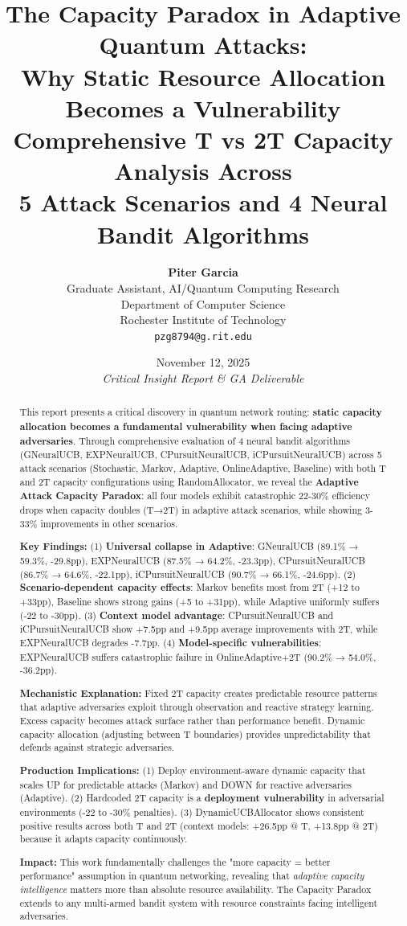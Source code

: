 \documentclass[11pt,a4paper]{article}
\title{
  \vspace{-1.5cm}
  \textbf{\LARGE The Capacity Paradox in Adaptive Quantum Attacks:} \\
  \vspace{0.4cm}
  \textbf{\Large Why Static Resource Allocation Becomes a Vulnerability} \\
  \vspace{0.6cm}
  \large Comprehensive T vs 2T Capacity Analysis Across \\
  5 Attack Scenarios and 4 Neural Bandit Algorithms
}
\author{
  \textbf{Piter Garcia} \\
  Graduate Assistant, AI/Quantum Computing Research \\
  Department of Computer Science \\
  Rochester Institute of Technology \\
  \texttt{pzg8794@g.rit.edu}
}
\date{
  November 12, 2025 \\
  \vspace{0.3cm}
  \textit{Critical Insight Report \& GA Deliverable}
}
\newcommand{\critical}[1]{\textcolor{criticalcolor}{\textbf{#1}}}
\begin{document}
\maketitle


\begin{abstract}
This report presents a critical discovery in quantum network routing: \textbf{static capacity allocation becomes a fundamental vulnerability when facing adaptive adversaries}. Through comprehensive evaluation of 4 neural bandit algorithms (GNeuralUCB, EXPNeuralUCB, CPursuitNeuralUCB, iCPursuitNeuralUCB) across 5 attack scenarios (Stochastic, Markov, Adaptive, OnlineAdaptive, Baseline) with both T and 2T capacity configurations using RandomAllocator, we reveal the \critical{Adaptive Attack Capacity Paradox}: all four models exhibit catastrophic 22-30\% efficiency drops when capacity doubles (T→2T) in adaptive attack scenarios, while showing 3-33\% improvements in other scenarios.

\textbf{Key Findings:} (1) \textbf{Universal collapse in Adaptive}: GNeuralUCB (89.1\% → 59.3\%, -29.8pp), EXPNeuralUCB (87.5\% → 64.2\%, -23.3pp), CPursuitNeuralUCB (86.7\% → 64.6\%, -22.1pp), iCPursuitNeuralUCB (90.7\% → 66.1\%, -24.6pp). (2) \textbf{Scenario-dependent capacity effects}: Markov benefits most from 2T (+12 to +33pp), Baseline shows strong gains (+5 to +31pp), while Adaptive uniformly suffers (-22 to -30pp). (3) \textbf{Context model advantage}: CPursuitNeuralUCB and iCPursuitNeuralUCB show +7.5pp and +9.5pp average improvements with 2T, while EXPNeuralUCB degrades -7.7pp. (4) \textbf{Model-specific vulnerabilities}: EXPNeuralUCB suffers catastrophic failure in OnlineAdaptive+2T (90.2\% → 54.0\%, -36.2pp).

\textbf{Mechanistic Explanation:} Fixed 2T capacity creates predictable resource patterns that adaptive adversaries exploit through observation and reactive strategy learning. Excess capacity becomes attack surface rather than performance benefit. Dynamic capacity allocation (adjusting between T boundaries) provides unpredictability that defends against strategic adversaries.

\textbf{Production Implications:} (1) Deploy environment-aware dynamic capacity that scales UP for predictable attacks (Markov) and DOWN for reactive adversaries (Adaptive). (2) Hardcoded 2T capacity is a \critical{deployment vulnerability} in adversarial environments (-22 to -30\% penalties). (3) DynamicUCBAllocator shows consistent positive results across both T and 2T (context models: +26.5pp @ T, +13.8pp @ 2T) because it adapts capacity continuously.

\textbf{Impact:} This work fundamentally challenges the "more capacity = better performance" assumption in quantum networking, revealing that \textit{adaptive capacity intelligence} matters more than absolute resource availability. The Capacity Paradox extends to any multi-armed bandit system with resource constraints facing intelligent adversaries.
\end{abstract}
\end{document}
